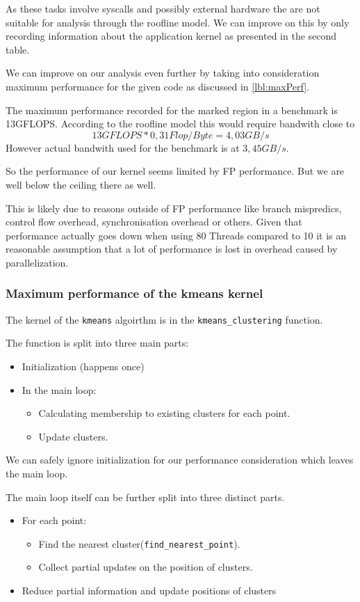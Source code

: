 As these tasks involve syscalls and possibly external hardware the are not suitable for analysis through the roofline model.
We can improve on this by only recording information about the application kernel as presented in the second table.

We can improve on our analysis even further by taking into consideration
maximum performance for the given code as discussed in \autoref{lbl:maxPerf}.

The maximum performance recorded for the marked region in a benchmark is 13GFLOPS.
According to the roofline model this would require bandwith close to $$13 GFLOPS * 0,31 Flop/Byte = 4,03 GB/s$$
However actual bandwith used for the benchmark is at $3,45 GB/s$.

So the performance of our kernel seems limited by FP performance. But we are well below the ceiling there as well.

This is likely due to reasons outside of FP performance
like branch mispredics, control flow overhead, synchronisation overhead or others. Given that performance actually goes
down when using 80 Threads compared to 10 it is an reasonable assumption that a lot of performance is lost in overhead
caused by parallelization.


\subsubsection{Maximum performance of the kmeans kernel}
\label{lbl:maxPerf}

The kernel of the \texttt{kmeans} algoirthm is in the \texttt{kmeans\_clustering} function.

The function is split into three main parts:
\begin{itemize}
	\item Initialization (happens once)
	\item In the main loop:
	\begin{itemize}
		\item Calculating membership to existing clusters for each point.
		\item Update clusters.
	\end{itemize}
\end{itemize}

We can safely ignore initialization for our performance consideration which leaves the main loop.

The main loop itself can be further split into three distinct parts.
\begin{itemize}
	\item For each point:
	\begin{itemize}
		\item Find the nearest cluster(\texttt{find\_nearest\_point}).
		\item Collect partial updates on the position of clusters.
	\end{itemize}
	\item Reduce partial information and update positions of clusters
\end{itemize}

